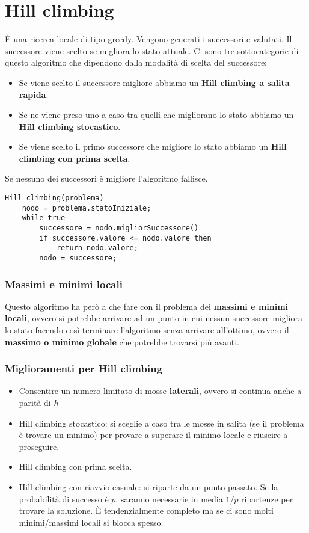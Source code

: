 \section{Hill climbing}
\`E una ricerca locale di tipo greedy. Vengono generati i successori e valutati. Il successore
viene scelto se migliora lo stato attuale. Ci sono tre sottocategorie di questo algoritmo che
dipendono dalla modalit\`a di scelta del successore:
\begin{itemize}
	\item Se viene scelto il successore migliore abbiamo un \textbf{Hill climbing a salita rapida}.
	\item Se ne viene preso uno a caso tra quelli che migliorano lo stato abbiamo un
	      \textbf{Hill climbing stocastico}.
	\item Se viene scelto il primo successore che migliore lo stato abbiamo un
	      \textbf{Hill climbing con prima scelta}.
\end{itemize}
Se nessuno dei successori \`e migliore l'algoritmo fallisce.

\begin{lstlisting}[style=pseudo-style]
Hill_climbing(problema)
	nodo = problema.statoIniziale;
	while true
		successore = nodo.migliorSuccessore()
		if successore.valore <= nodo.valore then
			return nodo.valore;
		nodo = successore;
\end{lstlisting}

\subsubsection{Massimi e minimi locali}
Questo algoritmo ha per\`o a che fare con il problema dei \textbf{massimi e minimi locali}, ovvero
si potrebbe arrivare ad un punto in cui nessun successore migliora lo stato facendo cos\`i terminare
l'algoritmo senza arrivare all'ottimo, ovvero il \textbf{massimo o minimo globale} che potrebbe
trovarsi pi\`u avanti.

\subsubsection{Miglioramenti per Hill climbing}
\begin{itemize}
	\item Consentire un numero limitato di mosse \textbf{laterali}, ovvero si continua anche
	      a parit\`a di $h$
	\item Hill climbing stocastico: si sceglie a caso tra le mosse in salita (se il problema
	      \`e trovare un minimo) per provare a superare il minimo locale e riuscire a proseguire.
	\item Hill climbing con prima scelta.
	\item Hill climbing con riavvio casuale: si riparte da un punto passato. Se la probabilit\`a
	      di successo \`e $p$, saranno necessarie in media $1 / p$ ripartenze per trovare la soluzione.
	      \`E tendenzialmente completo ma se ci sono molti minimi/massimi locali si blocca spesso.
\end{itemize}
